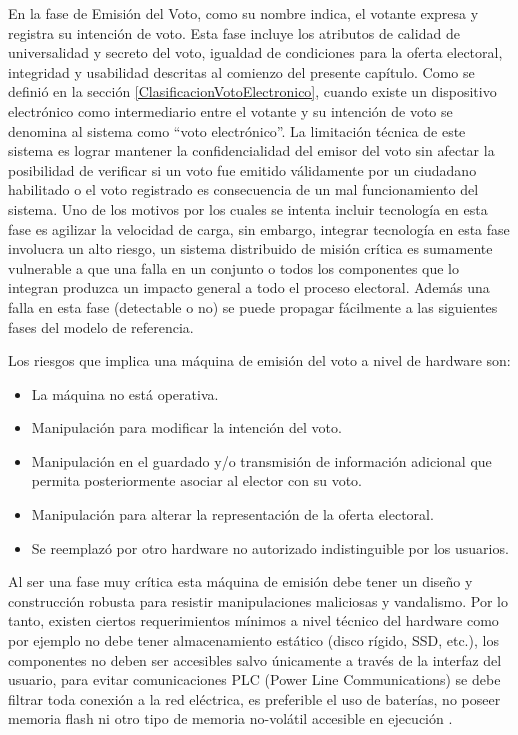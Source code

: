 En la fase de Emisión del Voto, como su nombre indica, el votante expresa y registra su intención de voto. Esta fase incluye los atributos de calidad de universalidad y secreto del voto, igualdad de condiciones para la oferta electoral, integridad y usabilidad descritas al comienzo del presente capítulo. Como se definió en la sección \ref{ClasificacionVotoElectronico}, cuando existe un dispositivo electrónico como intermediario entre el votante y su intención de voto se denomina al sistema como ``voto electrónico''. La limitación técnica de este sistema es lograr mantener la confidencialidad del emisor del voto sin afectar la posibilidad de verificar si un voto fue emitido válidamente por un ciudadano habilitado o el voto registrado es consecuencia de un mal funcionamiento del sistema. Uno de los motivos por los cuales se intenta incluir tecnología en esta fase es agilizar la velocidad de carga, sin embargo, integrar tecnología en esta fase involucra un alto riesgo, un sistema distribuido de misión crítica es sumamente vulnerable a que una falla en un conjunto o todos los componentes que lo integran produzca un impacto general a todo el proceso electoral. Además una falla en esta fase (detectable o no) se puede propagar fácilmente a las siguientes fases del modelo de referencia. 

Los riesgos que implica una máquina de emisión del voto a nivel de hardware son:
\begin{itemize}
    \item La máquina no está operativa.
    \item Manipulación para modificar la intención del voto.
    \item Manipulación en el guardado y/o transmisión de información adicional que permita posteriormente asociar al elector con su voto.
    \item Manipulación para alterar la representación de la oferta electoral.
    \item Se reemplazó por otro hardware no autorizado indistinguible por los usuarios.
\end{itemize}
Al ser una fase muy crítica esta máquina de emisión debe tener un diseño y construcción robusta para resistir manipulaciones maliciosas y vandalismo. Por lo tanto, existen ciertos requerimientos mínimos a nivel técnico del hardware como por ejemplo no debe tener almacenamiento estático (disco rígido, SSD, etc.), los componentes no deben ser accesibles salvo únicamente a través de la interfaz del usuario, para evitar comunicaciones PLC (Power Line Communications) \cite{plc} se debe filtrar toda conexión a la red eléctrica, es preferible el uso de baterías, no poseer memoria flash ni otro tipo de memoria no-volátil accesible en ejecución \cite{conicet}.

